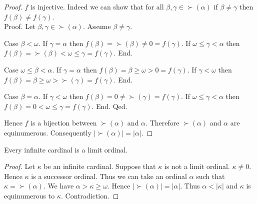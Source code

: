 \documentclass[10pt]{article}
\begin{document}
\begin{forthel}
\begin{proof}
      $f$ is injective.
      Indeed we can show that for all $\beta, \gamma \in \succ(\alpha)$ if
      $\beta \neq \gamma$ then $f(\beta) \neq f(\gamma)$. \\
      Proof.
        Let $\beta, \gamma \in \succ(\alpha)$.
        Assume $\beta \neq \gamma$.

        Case $\beta < \omega$.
          If $\gamma = \alpha$ then
          $f(\beta)
            = \succ(\beta)
            \neq 0
            = f(\gamma)$.
          If $\omega \leq \gamma < \alpha$ then
          $f(\beta)
            = \succ(\beta)
            < \omega
            \leq \gamma
            = f(\gamma)$.
        End.

        Case $\omega \leq \beta < \alpha$.
          If $\gamma = \alpha$ then
          $f(\beta)
            = \beta
            \geq \omega
            > 0
            = f(\gamma)$.
          If $\gamma < \omega$ then
          $f(\beta)
            = \beta
            \geq \omega
            > \succ(\gamma)
            = f(\gamma)$.
        End.

        Case $\beta = \alpha$.
          If $\gamma < \omega$ then
          $f(\beta)
            = 0
            \neq \succ(\gamma)
            = f(\gamma)$.
          If $\omega \leq \gamma < \alpha$ then
          $f(\beta)
            = 0
            < \omega
            \leq \gamma
            = f(\gamma)$.
        End.
      Qed.

      Hence $f$ is a bijection between $\succ(\alpha)$ and $\alpha$.
      Therefore $\succ(\alpha)$ and $\alpha$ are equinumerous.
      Consequently $|\succ(\alpha)| = |\alpha|$.
    \end{proof}
  \end{forthel}

  \begin{forthel}
    \begin{proposition}
      Every infinite cardinal is a limit ordinal.
    \end{proposition}
    \begin{proof}
      Let $\kappa$ be an infinite cardinal.
      Suppose that $\kappa$ is not a limit ordinal.
      $\kappa \neq 0$.
      Hence $\kappa$ is a successor ordinal.
      Thus we can take an ordinal $\alpha$ such that $\kappa = \succ(\alpha)$.
      We have $\alpha > \kappa \geq \omega$.
      Hence $|\succ(\alpha)| = |\alpha|$.
      Thus $\alpha < |\kappa|$ and $\kappa$ is equinumerous to $\kappa$.
      Contradiction.
    \end{proof}
  \end{forthel}
\end{document}
